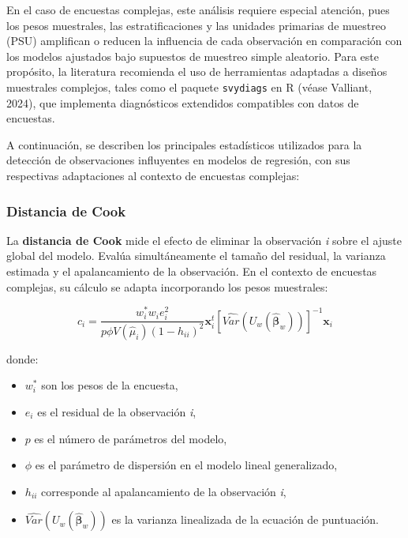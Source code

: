 \documentclass[
  spanish,
  12pt,
]{book}
\providecommand{\tightlist}{%
  \setlength{\itemsep}{0pt}\setlength{\parskip}{0pt}}
\begin{document}
En el caso de encuestas complejas, este análisis requiere especial atención, pues los pesos muestrales, las estratificaciones y las unidades primarias de muestreo (PSU) amplifican o reducen la influencia de cada observación en comparación con los modelos ajustados bajo supuestos de muestreo simple aleatorio. Para este propósito, la literatura recomienda el uso de herramientas adaptadas a diseños muestrales complejos, tales como el paquete \texttt{svydiags} en R (véase Valliant, 2024), que implementa diagnósticos extendidos compatibles con datos de encuestas.

A continuación, se describen los principales estadísticos utilizados para la detección de observaciones influyentes en modelos de regresión, con sus respectivas adaptaciones al contexto de encuestas complejas:

\subsubsection{Distancia de Cook}\label{distancia-de-cook}

La \textbf{distancia de Cook} mide el efecto de eliminar la observación \emph{i} sobre el ajuste global del modelo. Evalúa simultáneamente el tamaño del residual, la varianza estimada y el apalancamiento de la observación. En el contexto de encuestas complejas, su cálculo se adapta incorporando los pesos muestrales:

\[
c_{i}=\frac{w_{i}^{*}w_{i}e_{i}^{2}}{p\phi V\left(\hat{\mu}_{i}\right)\left(1-h_{ii}\right)^{2}}\boldsymbol{x}_{i}^{t}\left[\widehat{Var}\left(U_{w}\left(\hat{\boldsymbol{\beta}}_{w}\right)\right)\right]^{-1}\boldsymbol{x}_{i}
\]

donde:

\begin{itemize}
\tightlist
\item
  \(w_i^*\) son los pesos de la encuesta,
\item
  \(e_i\) es el residual de la observación \emph{i},
\item
  \(p\) es el número de parámetros del modelo,
\item
  \(\phi\) es el parámetro de dispersión en el modelo lineal generalizado,
\item
  \(h_{ii}\) corresponde al apalancamiento de la observación \emph{i},
\item
  \(\widehat{Var}\left(U_{w}\left(\hat{\boldsymbol{\beta}}_{w}\right)\right)\) es la varianza linealizada de la ecuación de puntuación.
\end{itemize}
\end{document}
